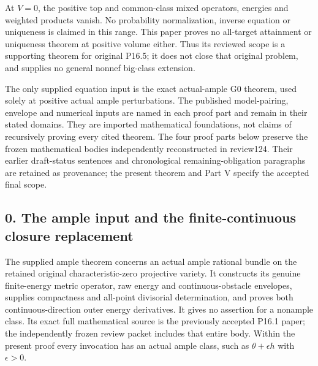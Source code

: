 \documentclass[
  10pt,
]{article}
\begin{document}
At \(V=0\), the positive top and common-class mixed operators, energies
and weighted products vanish. No probability normalization, inverse
equation or uniqueness is claimed in this range. This paper proves no
all-target attainment or uniqueness theorem at positive volume either.
Thus its reviewed scope is a supporting theorem for original P16.5; it
does not close that original problem, and supplies no general nonnef
big-class extension.

The only supplied equation input is the exact actual-ample G0 theorem,
used solely at positive actual ample perturbations. The published
model-pairing, envelope and numerical inputs are named in each proof
part and remain in their stated domains. They are imported mathematical
foundations, not claims of recursively proving every cited theorem. The
four proof parts below preserve the frozen mathematical bodies
independently reconstructed in review124. Their earlier draft-status
sentences and chronological remaining-obligation paragraphs are retained
as provenance; the present theorem and Part V specify the accepted final
scope.

\subsection{0. The ample input and the finite-continuous closure
replacement}\label{the-ample-input-and-the-finite-continuous-closure-replacement}

The supplied ample theorem concerns an actual ample rational bundle on
the retained original characteristic-zero projective variety. It
constructs its genuine finite-energy metric operator, raw energy and
continuous-obstacle envelopes, supplies compactness and all-point
divisorial determination, and proves both continuous-direction outer
energy derivatives. It gives no assertion for a nonample class. Its
exact full mathematical source is the previously accepted P16.1 paper;
the independently frozen review packet includes that entire body. Within
the present proof every invocation has an actual ample class, such as
\(\theta+\epsilon h\) with \(\epsilon>0\).
\end{document}
